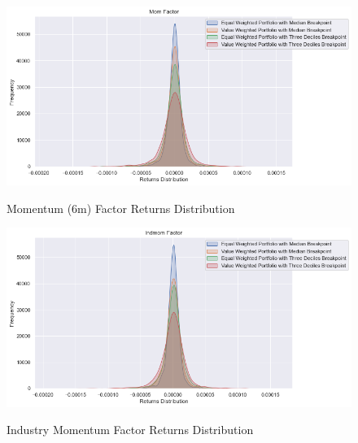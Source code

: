 

\begin{figure}[H]
	\caption{Momentum (6m) Factor Returns Distribution}
	\centering
	\includegraphics[scale=.63]{../../output/figures/mom.png}
	\label{fig:mom}
\end{figure}

\begin{figure}[H]
	\caption{Industry Momentum Factor Returns Distribution}
	\centering
	\includegraphics[scale=.63]{../../output/figures/indmom.png}
	\label{fig:indmom}
\end{figure}

